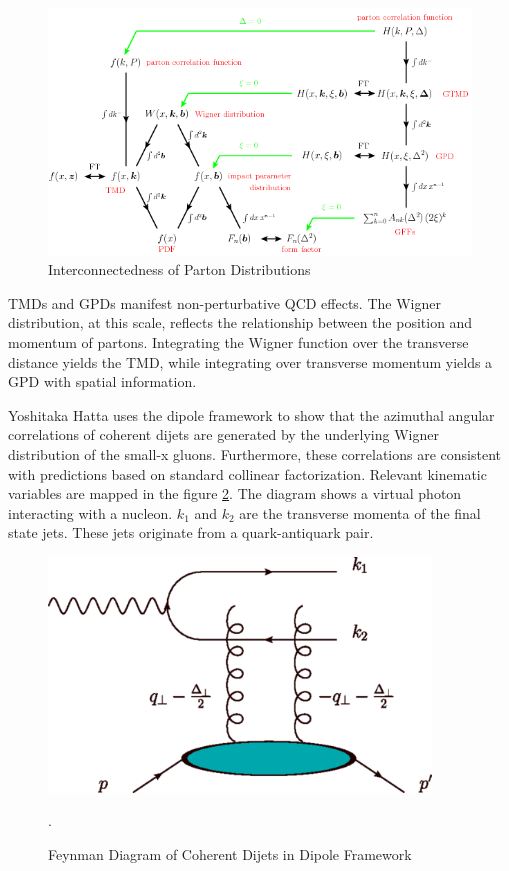 \begin{figure}[h!]
\begin{centering}
\includegraphics[width=7in]{Chapter1/importfigs/fig6_introGPD_TMD.png}
\par\end{centering}
\caption{Interconnectedness of Parton Distributions \cite{Diehl:2003ny} \label{fig:gpdTMDWeb}}
\end{figure}

TMDs and GPDs manifest non-perturbative QCD effects. The Wigner distribution, at this scale, reflects the relationship between the position and momentum of partons. Integrating the Wigner function over the transverse distance yields the TMD, while integrating over transverse momentum yields a GPD with spatial information. 

Yoshitaka Hatta uses the dipole framework to show that the azimuthal angular correlations of coherent dijets are generated by the underlying Wigner distribution of the small-x gluons. Furthermore, these correlations are consistent with predictions based on standard collinear factorization. Relevant kinematic variables are mapped in the figure \ref{fig:yatta1}. The diagram shows a virtual photon interacting with a nucleon. $k_1$ and $k_2$ are the transverse momenta of the final state jets. These jets originate from a quark-antiquark pair. 

\begin{figure}[h!]
\begin{centering}
\includegraphics[width=4in]{Chapter1/importfigs/fig4_yatta.png}
\par\end{centering}
\caption{Feynman Diagram of Coherent Dijets in Dipole Framework \cite{Hatta:2016dxp}\label{fig:yatta1}}.
\end{figure}

